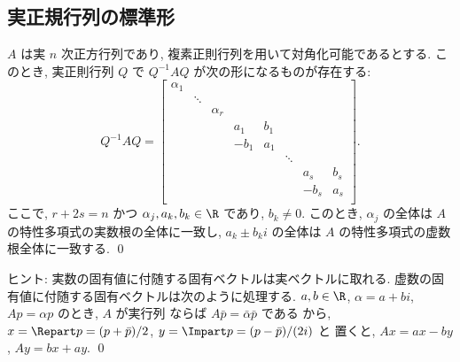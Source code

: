 \documentclass[12pt,twoside]{jarticle}
\begin{document}
\subsection{実正規行列の標準形}


\begin{question}[半単純実行列の標準形, 10点]
\label{q:real-semisimple}
  $A$ は実 $n$ 次正方行列であり, 複素正則行列を用いて対角化可能であるとする.
  このとき, 実正則行列 $Q$ で $Q^{-1}AQ$ が次の形になるものが存在する:
  \begin{equation*}
    Q^{-1}AQ =
    \begin{bmatrix}
      \alpha_1 &        &          &       &     &        &       &     \\
               & \ddots &          &       &     &        &       &     \\
               &        & \alpha_r &       &     &        &       &     \\
               &        &          &   a_1 & b_1 &        &       &     \\
               &        &          & - b_1 & a_1 &        &       &     \\
               &        &          &       &     & \ddots &       &     \\
               &        &          &       &     &        &   a_s & b_s \\
               &        &          &       &     &        & - b_s & a_s \\
    \end{bmatrix}.
  \end{equation*}
  ここで, $r+2s=n$ かつ $\alpha_j,a_k,b_k\in\R$ であり, $b_k\ne 0$. 
  このとき, $\alpha_j$ の全体は $A$ の特性多項式の実数根の全体に一致し,
  $a_k\pm b_k i$ の全体は $A$ の特性多項式の虚数根全体に一致する. \qed
\end{question}

\noindent
ヒント: 実数の固有値に付随する固有ベクトルは実ベクトルに取れる.
虚数の固有値に付随する固有ベクトルは次のように処理する. 
$a,b\in\R$, $\alpha=a+bi$, $Ap=\alpha p$ のとき, $A$ が実行列
ならば $A\bar{p}=\bar{\alpha}\bar{p}$ である
から, $x = \Repart p = (p+\bar{p})/2$, %
$y = \Impart p = (p-\bar{p})/(2i)$ と
置くと, $Ax = ax - by$, $Ay = bx + ay$.
\qed

\end{document}

